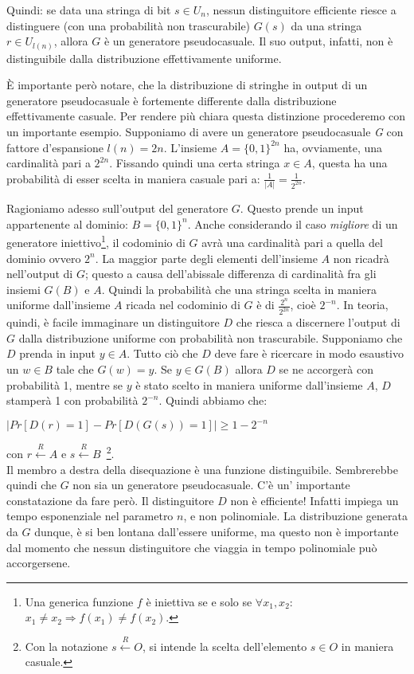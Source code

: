 \documentclass[a4paper,openright,twoside,12pt]{report}
\begin{document}
Quindi: se data una stringa di bit $s \in U_{n}$, nessun distinguitore efficiente riesce a distinguere (con una probabilit\`a non trascurabile) $G(s)$ da una stringa $r \in U_{l(n)}$, allora 
$G$ \`e un generatore pseudocasuale. Il suo output, infatti, non \`e distinguibile dalla distribuzione effettivamente uniforme.

\`E importante per\`o notare, che la distribuzione di stringhe in output di un generatore pseudocasuale \`e fortemente differente dalla distribuzione effettivamente casuale. Per rendere pi\`u chiara questa distinzione procederemo
con un importante esempio.
Supponiamo di avere un generatore pseudocasuale \emph{G} con fattore d'espansione $l(n)=2n$.
L'insieme $A=\{0, 1\}^{2n}$ ha, ovviamente, una cardinalit\`a pari a $2^{2n}$. Fissando quindi una certa stringa $x \in A$, 
questa ha una probabilit\`a di esser scelta in maniera casuale pari a: $\frac{1}{\lvert A \rvert} = \frac{1}{2^{2n}}$.

Ragioniamo adesso sull'output del generatore $G$. Questo prende un input appartenente al dominio: $B=\{0, 1\}^{n}$. 
Anche considerando il caso \emph{migliore} di un generatore iniettivo\footnote{Una generica funzione $f$ \`e iniettiva se e solo se $\forall x_1, x_2:$ $x_1 \neq x_2 \Rightarrow f(x_1) \neq f(x_2)$.},
il codominio di $G$ avr\`a una cardinalit\`a pari a quella del dominio ovvero $2^{n}$. La maggior parte degli elementi dell'insieme $A$ non ricadr\`a 
nell'output di $G$; questo a causa dell'abissale differenza di cardinalit\`a fra gli insiemi $G(B)$ e $A$.
Quindi la probabilit\`a che una stringa scelta in maniera uniforme dall'insieme $A$ ricada nel codominio di $G$ \`e di $\frac{2^{n}}{2^{2n}}$, cio\`e $2^{-n}$.
In teoria, quindi, \`e facile immaginare un distinguitore $D$ che riesca a discernere l'output di $G$ dalla distribuzione uniforme con probabilit\`a non trascurabile.
Supponiamo che $D$ prenda in input $y \in A$. Tutto ci\`o che $D$ deve fare \`e ricercare in modo esaustivo un $w \in B$ tale che $G(w) = y$.
Se $y \in G(B)$ allora $D$ se ne accorger\`a con probabilit\`a 1, mentre se $y$ \`e stato scelto in maniera uniforme dall'insieme $A$, $D$ stamper\`a 1 con probabilit\`a $2^{-n}$. 
\newpage Quindi abbiamo che:
\begin{center}
$\lvert Pr[D(r)=1] - Pr[D(G(s))=1]\rvert \geq 1 - 2^{-n}$
\end{center} 
con $r \xleftarrow{R} A$ e $s \xleftarrow{R} B$~\footnote{Con la notazione $s \xleftarrow{R} O$, si intende la scelta dell'elemento 
$s \in O$ in maniera casuale.}.\\
Il membro a destra della disequazione \`e una funzione distinguibile. Sembrerebbe quindi che $G$ non sia un generatore pseudocasuale.
C'\`e un' importante constatazione da fare per\`o. Il distinguitore $D$ non \`e efficiente! Infatti impiega un tempo esponenziale nel parametro $n$, e non polinomiale.
La distribuzione generata da $G$ dunque, \`e si ben lontana dall'essere uniforme, ma questo non \`e importante dal momento che nessun distinguitore che viaggia in tempo polinomiale pu\`o 
accorgersene.
\end{document}
